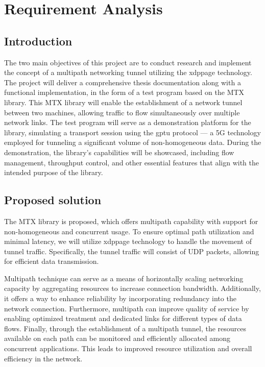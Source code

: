 \chapter{Requirement Analysis}\label{sec:reqs}\minitoc\vspace{.5cm}

\section{Introduction}
The two main objectives of this project are to conduct research and implement the concept of a multipath networking tunnel utilizing the \ac{xdppage} technology. The project will deliver a comprehensive thesis documentation along with a functional implementation, in the form of a test program based on the \ac{MTX} library.
This \ac{MTX} library will enable the establishment of a network tunnel between two machines, allowing traffic to flow simultaneously over multiple network links. 
The test program will serve as a demonstration platform for the library, simulating a transport session using the \ac{gptu} protocol — a 5G technology employed for tunneling a significant volume of non-homogeneous data.
During the demonstration, the library's capabilities will be showcased, including flow management, throughput control, and other essential features that align with the intended purpose of the library.

\section{Proposed solution}\label{sec:reqs:proposed_solution}
The MTX library is proposed, which offers multipath capability with support for non-homogeneous and concurrent usage.
To ensure optimal path utilization and minimal latency, we will utilize \ac{xdppage} technology to handle the movement of tunnel traffic. 
Specifically, the tunnel traffic will consist of UDP packets, allowing for efficient data transmission.

Multipath technique can serve as a means of horizontally scaling networking capacity by aggregating resources to increase connection bandwidth. 
Additionally, it offers a way to enhance reliability by incorporating redundancy into the network connection. Furthermore, multipath can improve quality of service by enabling optimized treatment and dedicated links for different types of data flows.
Finally, through the establishment of a multipath tunnel, the resources available on each path can be monitored and efficiently allocated among concurrent applications. 
This leads to improved resource utilization and overall efficiency in the network.

